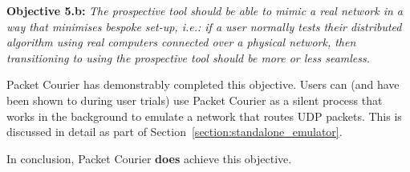 \textbf{Objective 5.b:} \emph{The prospective tool should be able to mimic a real network in a way that minimises
bespoke set-up, i.e.: if a user normally tests their distributed algorithm using real computers connected over a
physical network, then transitioning to using the prospective tool should be more or less seamless.}

Packet Courier has demonstrably completed this objective. Users can (and have been shown to during user trials) use
Packet Courier as a silent process that works in the background to emulate a network that routes UDP packets. This is
discussed in detail as part of Section~\ref{section:standalone_emulator}.

In conclusion, Packet Courier \textbf{does} achieve this objective.